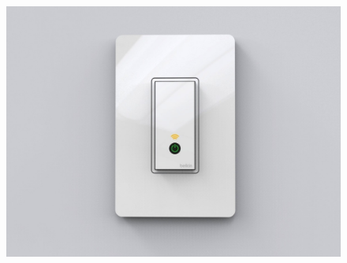 \begin{frame}
\begin{itemize}
\begin{columns}
\begin{column}{0.48\textwidth}
\begin{figure}[htbp]
        \includegraphics[width=\textwidth]{Images/wemo2.jpg}
		\end{figure}
      \end{column}
  \end{columns}
	\end{itemize}
\end{frame}
